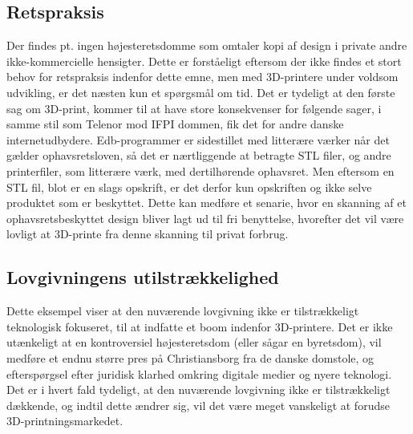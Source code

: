 \subsection{Retspraksis}

Der findes pt. ingen højesteretsdomme som omtaler kopi af design i private andre ikke-kommercielle hensigter\cite{jura5}. Dette er forståeligt eftersom der ikke findes et stort behov for retspraksis indenfor dette emne, men med 3D-printere under voldsom udvikling, er det næsten kun et spørgsmål om tid. Det er tydeligt at den første sag om 3D-print, kommer til at have store konsekvenser for følgende sager, i samme stil som Telenor mod IFPI dommen, fik det for andre danske internetudbydere\cite{jura6}.
Edb-programmer er sidestillet med litterære værker når det gælder ophavsretsloven\cite{jura7}, så det er nærtliggende at betragte STL filer, og andre printerfiler, som litterære værk, med dertilhørende ophavsret. Men eftersom en STL fil, blot er en slags opskrift, er det derfor kun opskriften og ikke selve produktet som er beskyttet. Dette kan medføre et senarie, hvor en skanning af et ophavsretsbeskyttet design bliver lagt ud til fri benyttelse, hvorefter det vil være lovligt at 3D-printe fra denne skanning til privat forbrug.

\subsection{Lovgivningens utilstrækkelighed}
 
Dette eksempel viser at den nuværende lovgivning ikke er tilstrækkeligt teknologisk fokuseret, til at indfatte et boom indenfor 3D-printere. Det er ikke utænkeligt at en kontroversiel højesteretsdom (eller sågar en byretsdom), vil medføre et endnu større pres på Christiansborg fra de danske domstole, og efterspørgsel efter juridisk klarhed omkring digitale medier og nyere teknologi.
Det er i hvert fald tydeligt, at den nuværende lovgivning ikke er tilstrækkeligt dækkende, og indtil dette ændrer sig, vil det være meget vanskeligt at forudse 3D-printningsmarkedet.
